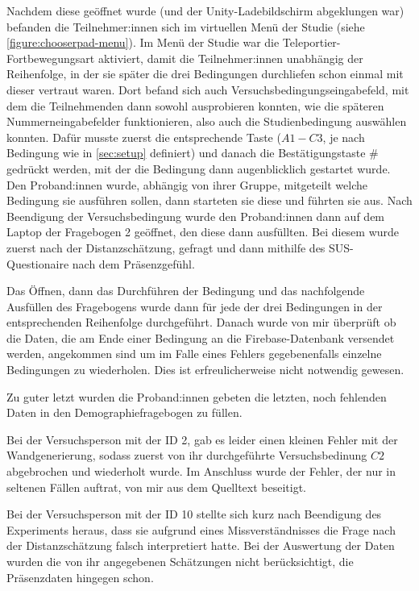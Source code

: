         Nachdem diese geöffnet wurde (und der Unity-Ladebildschirm abgeklungen war) befanden die Teilnehmer:innen sich im virtuellen Menü der Studie (siehe \autoref{figure:chooserpad-menu}). Im Menü der Studie war die Teleportier-Fortbewegungsart aktiviert, damit die Teilnehmer:innen unabhängig der Reihenfolge, in der sie später die drei Bedingungen durchliefen schon einmal mit dieser vertraut waren.
        Dort befand sich auch Versuchsbedingungseingabefeld, mit dem die Teilnehmenden dann sowohl ausprobieren konnten, wie die späteren Nummerneingabefelder funktionieren, also auch die Studienbedingung auswählen konnten. Dafür musste zuerst die entsprechende Taste ($A1-C3$, je nach Bedingung wie in \autoref{sec:setup} definiert) und danach die Bestätigungstaste \# gedrückt werden, mit der die Bedingung dann augenblicklich gestartet wurde. Den Proband:innen wurde, abhängig von ihrer Gruppe, mitgeteilt welche Bedingung sie ausführen sollen, dann starteten sie diese und führten sie aus.
        Nach Beendigung der Versuchsbedingung wurde den Proband:innen dann auf dem Laptop der Fragebogen 2 %
        geöffnet, den diese dann ausfüllten. Bei diesem wurde zuerst nach der Distanzschätzung, gefragt und dann mithilfe des SUS-Questionaire
        nach dem Präsenzgefühl.

        Das Öffnen, dann das Durchführen der Bedingung und das nachfolgende Ausfüllen des Fragebogens %
        wurde dann für jede der drei Bedingungen in der entsprechenden Reihenfolge durchgeführt. Danach wurde von mir überprüft ob die Daten, die am Ende einer Bedingung an die Firebase-Datenbank versendet werden, angekommen sind um im Falle eines Fehlers gegebenenfalls einzelne Bedingungen zu wiederholen. Dies ist erfreulicherweise nicht notwendig gewesen.

        Zu guter letzt wurden die Proband:innen gebeten die letzten, noch fehlenden Daten in den Demographiefragebogen zu füllen.

        Bei der Versuchsperson mit der ID 2, gab es leider einen kleinen Fehler mit der Wandgenerierung, sodass zuerst von ihr durchgeführte Versuchsbedinung $C2$ abgebrochen und wiederholt wurde. Im Anschluss wurde der Fehler, der nur in seltenen Fällen auftrat, von mir aus dem Quelltext beseitigt.

        Bei der Versuchsperson mit der ID 10 stellte sich kurz nach Beendigung des Experiments heraus, dass sie aufgrund eines Missverständnisses die Frage nach der Distanzschätzung falsch interpretiert hatte. Bei der Auswertung der Daten wurden die von ihr angegebenen Schätzungen nicht berücksichtigt, die Präsenzdaten hingegen schon.

